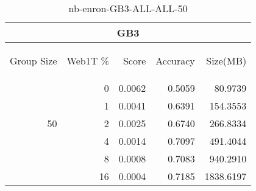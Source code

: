 \begin{center}
\begin{table}[htbp] 
 \begin{center}
\begin{tabular}{ | r | r | r | r | r |}
\hline
\multicolumn{5}{|c|}{GB3}\\
\hline
\begin{sideways}Group Size\end{sideways} & \begin{sideways}Web1T \%\end{sideways} & \begin{sideways}Score\end{sideways} & \begin{sideways}Accuracy\end{sideways} & \begin{sideways}Size(MB)\end{sideways}\\
\hline
\multirow{5}{*}{50}
 & 0 & 0.0062 & 0.5059 & 80.9739\\ \cline{2-5}
 & 1 & 0.0041 & 0.6391 & 154.3553\\ \cline{2-5}
 & 2 & 0.0025 & 0.6740 & 266.8334\\ \cline{2-5}
 & 4 & 0.0014 & 0.7097 & 491.4044\\ \cline{2-5}
 & 8 & 0.0008 & 0.7083 & 940.2910\\ \cline{2-5}
 & 16 & 0.0004 & 0.7185 & 1838.6197\\ \cline{2-5}
\hline
\end{tabular}
\caption{nb-enron-GB3-ALL-ALL-50}
\label{table:nb-enron-GB3-ALL-ALL-50}
\end{center}
 \end{table}
\end{center}

